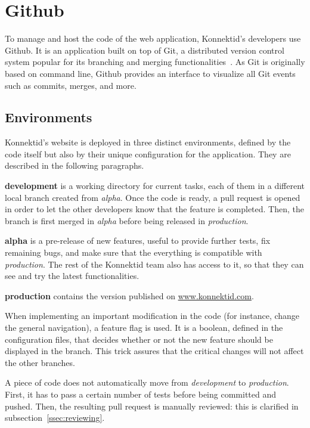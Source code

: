 \section{Github}
\label{sec:github}

To manage and host the code of the web application, Konnektid's developers use Github. It is an application built on top of Git, a distributed version control system popular for its branching and merging functionalities~\cite{git}. As Git is originally based on command line, Github provides an interface to visualize all Git events such as commits, merges, and more.

\subsection{Environments}
\label{ssec:env}

Konnektid's website is deployed in three distinct environments, defined by the code itself but also by their unique configuration for the application. They are described in the following paragraphs.

\textbf{development} is a working directory for current tasks, each of them in a different local branch created from \textit{alpha}. Once the code is ready, a pull request is opened in order to let the other developers know that the feature is completed. Then, the branch is first merged in \textit{alpha} before being released in \textit{production}. 

\textbf{alpha} is a \guillemotleft{} pre-release \guillemotright{} of new features, useful to provide further tests, fix remaining bugs, and make sure that the everything is compatible with \textit{production}. The rest of the Konnektid team also has access to it, so that they can see and try the latest functionalities.

\textbf{production} contains the version published on \url{www.konnektid.com}.

When implementing an important modification in the code (for instance, change the general navigation), a \guillemotleft{} feature flag \guillemotright{} is used. It is a boolean, defined in the configuration files, that decides whether or not the new feature should be displayed in the branch. This trick assures that the critical changes will not affect the other branches.

A piece of code does not automatically move from \textit{development} to \textit{production}. First, it has to pass a certain number of tests before being committed and pushed. Then, the resulting pull request is manually reviewed: this is clarified in {\sc subsection}~\ref{ssec:reviewing}.

